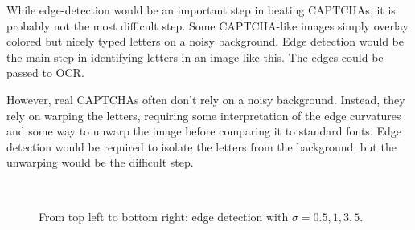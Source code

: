 \documentclass{article}
\theoremstyle{definition}
\begin{document}
While edge-detection would be an important step in beating CAPTCHAs,
it is probably not the most difficult step. Some CAPTCHA-like images
simply overlay colored but nicely typed letters on a noisy background.
Edge detection would be the main step in identifying letters in an image
like this. The edges could be passed to OCR.

However, real CAPTCHAs often don't rely on a noisy background. Instead,
they rely on warping the letters, requiring some interpretation of
the edge curvatures and some way to unwarp the image before comparing it
to standard fonts. Edge detection would be required to isolate the
letters from the background, but the unwarping would be the difficult step.

    \begin{figure}\centering
        \hspace{1mm}
        \\\vspace{2mm}
        \hspace{1mm}
        \caption{\label{headphones_edges}From top left to bottom right:
        edge detection with $\sigma = 0.5, 1, 3, 5$.}
    \end{figure}
\end{document}
